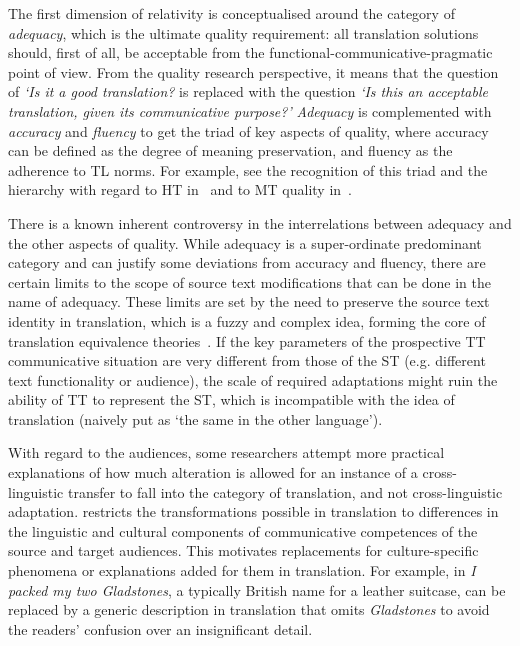 The first dimension of relativity is conceptualised around the category of \textit{adequacy}, which is the ultimate quality requirement: all translation solutions should, first of all, be acceptable from the functional-communicative-pragmatic point of view. From the quality research perspective, it means that the question of \emph{`Is it a good translation?} is replaced with the question \emph{`Is this an acceptable translation, given its communicative purpose?'}
\textit{Adequacy} is complemented with \textit{accuracy} and \textit{fluency} to get the triad of key aspects of quality, where accuracy can be defined as the degree of meaning preservation, and fluency as the adherence to TL norms. For example, see the recognition of this triad and the hierarchy with regard to HT in~\citet{Chesterman1998} and to MT quality in~\citet{Koponen2010}.

There is a known inherent controversy in the interrelations between adequacy and the other aspects of quality. While adequacy is a super-ordinate predominant category and can justify some deviations from accuracy and fluency, there are certain limits to the scope of source text modifications that can be done in the name of adequacy. These limits are set by the need to preserve the source text identity in translation, which is a fuzzy and complex idea, forming the core of translation equivalence theories~\cite[such as proposed by][]{Nida1964}. 
If the key parameters of the prospective TT communicative situation are very different from those of the ST (e.g. different text functionality or audience), the scale of required adaptations might ruin the ability of TT to represent the ST, which is incompatible with the idea of translation (naively put as `the same in the other language').

With regard to the audiences, some researchers attempt more practical explanations of how much alteration is allowed for an instance of a cross-linguistic transfer to fall into the category of translation, and not cross-linguistic adaptation. \citet{Latyshev2003} restricts the transformations possible in translation to differences in the linguistic and cultural components of communicative competences of the source and target audiences. This motivates replacements for culture-specific phenomena or explanations added for them in translation. For example, in \textit{I packed my two Gladstones}, a typically British name for a leather suitcase, can be replaced by a generic description in translation that omits \textit{Gladstones} to avoid the readers' confusion over an insignificant detail.


